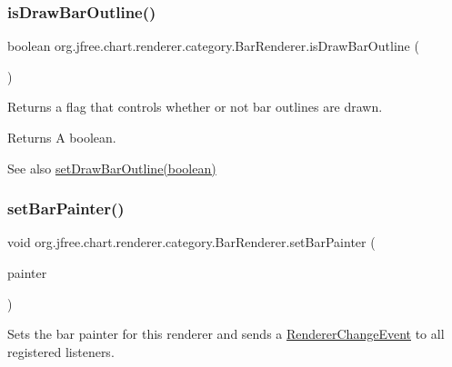 \subsubsection{\texorpdfstring{is\+Draw\+Bar\+Outline()}{isDrawBarOutline()}}
{\footnotesize\ttfamily boolean org.\+jfree.\+chart.\+renderer.\+category.\+Bar\+Renderer.\+is\+Draw\+Bar\+Outline (\begin{DoxyParamCaption}{ }\end{DoxyParamCaption})}

Returns a flag that controls whether or not bar outlines are drawn.

\begin{DoxyReturn}{Returns}
A boolean.
\end{DoxyReturn}
\begin{DoxySeeAlso}{See also}
\mbox{\hyperlink{classorg_1_1jfree_1_1chart_1_1renderer_1_1category_1_1_bar_renderer_ae1e06caa24551602f7d3953ca986d34f}{set\+Draw\+Bar\+Outline(boolean)}} 
\end{DoxySeeAlso}
\mbox{\label{classorg_1_1jfree_1_1chart_1_1renderer_1_1category_1_1_bar_renderer_a7078d6a2ff8aebd78b2be65c4d9a8491}} 
\subsubsection{\texorpdfstring{set\+Bar\+Painter()}{setBarPainter()}}
{\footnotesize\ttfamily void org.\+jfree.\+chart.\+renderer.\+category.\+Bar\+Renderer.\+set\+Bar\+Painter (\begin{DoxyParamCaption}\item[{\mbox{\hyperlink{interfaceorg_1_1jfree_1_1chart_1_1renderer_1_1category_1_1_bar_painter}{Bar\+Painter}}}]{painter }\end{DoxyParamCaption})}

Sets the bar painter for this renderer and sends a \mbox{\hyperlink{}{Renderer\+Change\+Event}} to all registered listeners.


